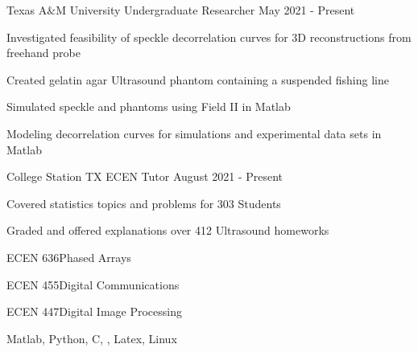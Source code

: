 \documentclass[11pt]{article} %
\begin{document}
\begin{description}
\squish

{Texas A$\&$M University}
{Undergraduate Researcher}
{May 2021 - Present}

Investigated feasibility of speckle decorrelation curves for 3D reconstructions from freehand probe

Created gelatin agar Ultrasound phantom containing a suspended fishing line

Simulated speckle and phantoms using Field II in Matlab

Modeling decorrelation curves for simulations and experimental data sets in Matlab



{College Station TX}
{ECEN Tutor}
{August 2021 - Present}

Covered statistics topics and problems for 303 Students

Graded and offered explanations over 412 Ultrasound homeworks




%
%


\end{description}

 {ECEN 636}{Phased Arrays}

 {}{}

{ECEN 455}{Digital Communications}

 {ECEN 447}{Digital Image Processing}


{}{}
{Matlab, Python, C, \CPP, Latex, Linux}
\end{document}
